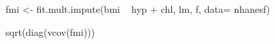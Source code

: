 \begin{Schunk}
\begin{Soutput}
fmi <- fit.mult.impute(bmi ~ hyp + chl, lm, f, data= nhanesf)
\end{Soutput}
\begin{Soutput}
sqrt(diag(vcov(fmi)))
\end{Soutput}
\end{Schunk}
